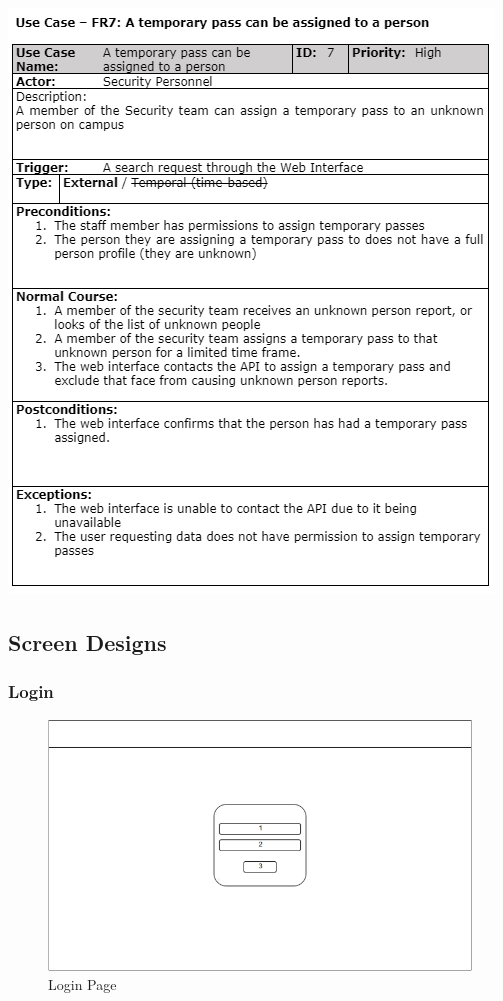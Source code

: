\documentclass[
  english,
  a4paper,
,tablecaptionabove
]{scrartcl}
\begin{document}
\includegraphics{images/ppm-images/use-case-7.png} \newpage

\hypertarget{screen-designs}{%
\subsection{Screen Designs}\label{screen-designs}}

\hypertarget{login}{%
\subsubsection{Login}\label{login}}

\begin{figure}
\centering
\includegraphics{images/ppm-images/login-design.png}
\caption{Login Page}
\end{figure}
\end{document}
